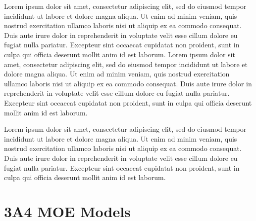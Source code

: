 Lorem ipsum dolor sit amet, consectetur adipiscing elit, sed do eiusmod tempor incididunt ut labore et dolore magna aliqua. Ut enim ad minim veniam, quis nostrud exercitation ullamco laboris nisi ut aliquip ex ea commodo consequat. Duis aute irure dolor in reprehenderit in voluptate velit esse cillum dolore eu fugiat nulla pariatur. Excepteur sint occaecat cupidatat non proident, sunt in culpa qui officia deserunt mollit anim id est laborum. Lorem ipsum dolor sit amet, consectetur adipiscing elit, sed do eiusmod tempor incididunt ut labore et dolore magna aliqua. Ut enim ad minim veniam, quis nostrud exercitation ullamco laboris nisi ut aliquip ex ea commodo consequat. Duis aute irure dolor in reprehenderit in voluptate velit esse cillum dolore eu fugiat nulla pariatur. Excepteur sint occaecat cupidatat non proident, sunt in culpa qui officia deserunt mollit anim id est laborum.

Lorem ipsum dolor sit amet, consectetur adipiscing elit, sed do eiusmod tempor incididunt ut labore et dolore magna aliqua. Ut enim ad minim veniam, quis nostrud exercitation ullamco laboris nisi ut aliquip ex ea commodo consequat. Duis aute irure dolor in reprehenderit in voluptate velit esse cillum dolore eu fugiat nulla pariatur. Excepteur sint occaecat cupidatat non proident, sunt in culpa qui officia deserunt mollit anim id est laborum.


\section{3A4 MOE Models}

